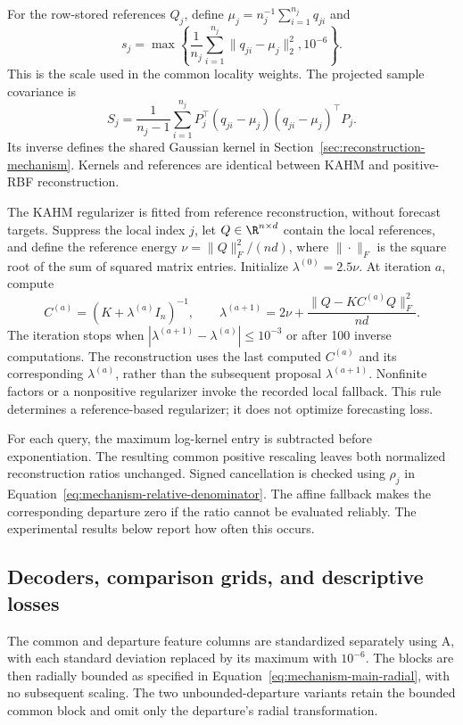 For the row-stored references $Q_j$, define
$\mu_j=n_j^{-1}\sum_{i=1}^{n_j}q_{ji}$ and
\[
 s_j=\max\left\{\frac1{n_j}\sum_{i=1}^{n_j}
                \|q_{ji}-\mu_j\|_2^2,10^{-6}\right\}.
\]
This is the scale used in the common locality weights. The projected
sample covariance is
\[
 S_j=\frac1{n_j-1}\sum_{i=1}^{n_j}
       P_j^\top(q_{ji}-\mu_j)(q_{ji}-\mu_j)^\top P_j.
\]
Its inverse defines the shared Gaussian kernel in
Section~\ref{sec:reconstruction-mechanism}. Kernels and references are
identical between KAHM and positive-RBF reconstruction.

The KAHM regularizer is fitted from reference reconstruction, without
forecast targets. Suppress the local index $j$, let $Q\in\R^{n\times d}$
contain the local references, and define the reference energy
$\nu=\|Q\|_F^2/(nd)$, where $\|\cdot\|_F$ is the square root of the
sum of squared matrix entries. Initialize $\lambda^{(0)}=2.5\nu$.
At iteration $a$, compute
\[
 C^{(a)}=(K+\lambda^{(a)}I_n)^{-1},\qquad
 \lambda^{(a+1)}=2\nu+
     \frac{\|Q-KC^{(a)}Q\|_F^2}{nd}.
\]
The iteration stops when
$|\lambda^{(a+1)}-\lambda^{(a)}|\le10^{-3}$ or after 100 inverse
computations. The reconstruction uses the last computed $C^{(a)}$ and
its corresponding $\lambda^{(a)}$, rather than the subsequent proposal
$\lambda^{(a+1)}$. Nonfinite factors or a nonpositive regularizer invoke
the recorded local fallback. This rule determines a reference-based
regularizer; it does not optimize forecasting loss.

For each query, the maximum log-kernel entry is subtracted before
exponentiation. The resulting common positive rescaling leaves both
normalized reconstruction ratios unchanged. Signed cancellation is
checked using $\rho_j$ in Equation~\eqref{eq:mechanism-relative-denominator}.
The affine fallback makes the corresponding departure zero if the ratio
cannot be evaluated reliably. The experimental results below report how
often this occurs.

\subsection{Decoders, comparison grids, and descriptive losses}

The common and departure feature columns are standardized separately
using A, with each standard deviation replaced by its maximum with
$10^{-6}$. The blocks are then radially bounded as specified in
Equation~\eqref{eq:mechanism-main-radial}, with no subsequent scaling.
The two unbounded-departure variants retain the bounded common block
and omit only the departure's radial transformation.

